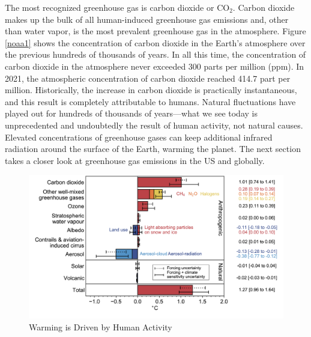 The most recognized greenhouse gas is carbon dioxide or CO$_2$. Carbon dioxide makes up the bulk of all human-induced greenhouse gas emissions and, other than water vapor, is the most prevalent greenhouse gas in the atmosphere. Figure \ref{noaa1} shows the concentration of carbon dioxide in the Earth's atmosphere over the previous hundreds of thousands of years. In all this time, the concentration of carbon dioxide in the atmosphere never exceeded 300 parts per million (ppm). In 2021, the atmospheric concentration of carbon dioxide reached 414.7 part per million. Historically, the increase in carbon dioxide is practically instantaneous, and this result is completely attributable to humans. Natural fluctuations have played out for hundreds of thousands of years---what we see today is unprecedented and undoubtedly the result of human activity, not natural causes. Elevated concentrations of greenhouse gases can keep additional infrared radiation around the surface of the Earth, warming the planet. The next section takes a closer look at greenhouse gas emissions in the US and globally. 

\begin{figure}
\centering
\caption{Warming is Driven by Human Activity \label{forcing}}
\includegraphics[width=\textwidth]{figures/chapter1_figures/ipcc_radiative_forcing.png}
\end{figure}

